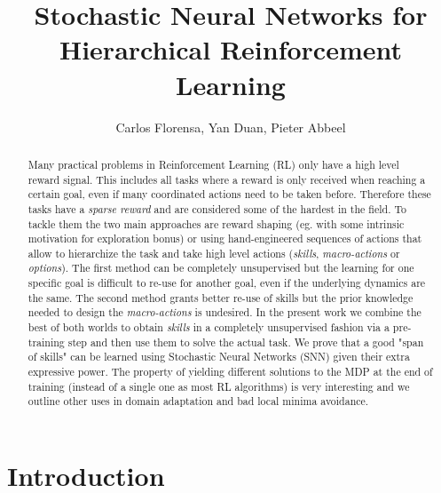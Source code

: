 \documentclass{article}[10pt]%
\title{Stochastic Neural Networks for \\Hierarchical Reinforcement Learning}
\author{
	Carlos Florensa, Yan Duan, Pieter Abbeel
}
\begin{document}
	
	
	\maketitle

\begin{abstract}

Many practical problems in Reinforcement Learning (RL) only have a high level reward signal. This includes all tasks where a reward is only received when reaching a certain goal, even if many coordinated actions need to be taken before. Therefore these tasks have a \textit{sparse reward} and are considered some of the hardest in the field. To tackle them the two main approaches are reward shaping (eg. with some intrinsic motivation for exploration bonus) or using hand-engineered sequences of actions that allow to hierarchize the task and take high level actions (\textit{skills}, \textit{macro-actions} or \textit{options}). The first method can be completely unsupervised but the learning for one specific goal is difficult to re-use for another goal, even if the underlying dynamics are the same. The second method grants better re-use of skills but the prior knowledge needed to design the \textit{macro-actions} is undesired. In the present work we combine the best of both worlds to obtain \textit{skills} in a completely unsupervised fashion via a pre-training step and then use them to solve the actual task. We prove that a good "span of skills" can be learned using Stochastic Neural Networks (SNN) given their extra expressive power. The property of yielding different solutions to the MDP at the end of training (instead of a single one as most RL algorithms) is very interesting and we outline other uses in domain adaptation and bad local minima avoidance.
\end{abstract}

\section{Introduction}

\end{document}
